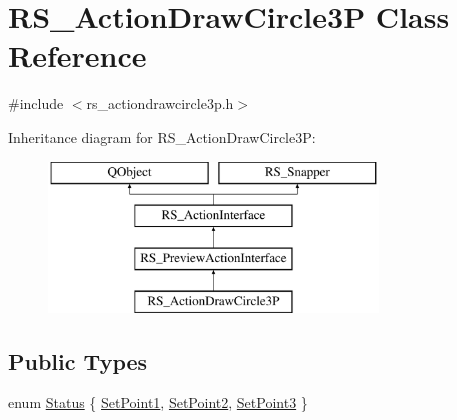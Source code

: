 \hypertarget{classRS__ActionDrawCircle3P}{\section{R\-S\-\_\-\-Action\-Draw\-Circle3\-P Class Reference}
\label{classRS__ActionDrawCircle3P}
}


{\ttfamily \#include $<$rs\-\_\-actiondrawcircle3p.\-h$>$}

Inheritance diagram for R\-S\-\_\-\-Action\-Draw\-Circle3\-P\-:\begin{figure}[H]
\begin{center}
\leavevmode
\includegraphics[height=4.000000cm]{classRS__ActionDrawCircle3P}
\end{center}
\end{figure}
\subsection*{Public Types}
\begin{DoxyCompactItemize}
\item 
enum \hyperlink{classRS__ActionDrawCircle3P_aca38734ef520660d1b31ca2c18d13618}{Status} \{ \hyperlink{classRS__ActionDrawCircle3P_aca38734ef520660d1b31ca2c18d13618a830341466ce13035f7b9fb7a7c3e95f2}{Set\-Point1}, 
\hyperlink{classRS__ActionDrawCircle3P_aca38734ef520660d1b31ca2c18d13618a8ebb28b22605c5228bbdcfbb24847b9b}{Set\-Point2}, 
\hyperlink{classRS__ActionDrawCircle3P_aca38734ef520660d1b31ca2c18d13618a54d220e0e6d7a5f143d2fb0c5693bac5}{Set\-Point3}
 \}
\end{DoxyCompactItemize}
